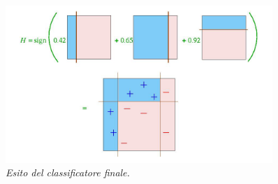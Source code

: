 \begin{figure}[!h]
\centering
\includegraphics[width=0.9\textwidth]{esempio_adaboost5.png}%
 \caption{\textit{Esito del classificatore finale.}}
 \label{grafico5}
\end{figure}





